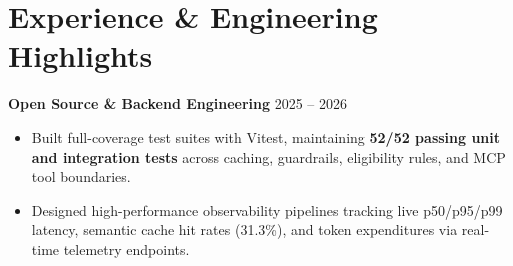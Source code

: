 \documentclass[10pt,letterpaper]{article}
\begin{document}
\vspace{-4pt}

\section{Experience \& Engineering Highlights}

\textbf{Open Source \& Backend Engineering} \hfill 2025 -- 2026
\begin{itemize}
    \item Built full-coverage test suites with Vitest, maintaining \textbf{52/52 passing unit and integration tests} across caching, guardrails, eligibility rules, and MCP tool boundaries.
    \item Designed high-performance observability pipelines tracking live p50/p95/p99 latency, semantic cache hit rates (31.3\%), and token expenditures via real-time telemetry endpoints.
\end{itemize}
\end{document}
